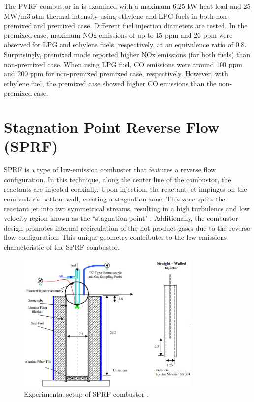 The PVRF combustor in \cite{AHMAD2023101200} is examined with a maximum 6.25 kW heat load and 25 MW/m3-atm thermal intensity using ethylene and LPG fuels in both non-premixed and premixed case. Different fuel injection diameters are tested. In the premixed case, maximum NOx emissions of up to 15 ppm and 26 ppm were observed for LPG and ethylene fuels, respectively, at an equivalence ratio of 0.8. Surprisingly, premixed mode reported higher NOx emissions (for both fuels) than non-premixed case. When using LPG fuel, CO emissions were around 100 ppm and 200 ppm for non-premixed premixed case, respectively. However, with ethylene fuel, the premixed case showed higher CO emissions than the non-premixed case.

\section{Stagnation Point Reverse Flow (SPRF)}

SPRF is a type of low-emission combustor that features a reverse flow configuration. In this technique, along the center line of the combustor, the reactants are injected coaxially. Upon injection, the reactant jet impinges on the combustor's bottom wall, creating a stagnation zone. This zone splits the reactant jet into two symmetrical streams, resulting in a high turbulence and low velocity region known as the ``stagnation point" \cite{bobba2008SPRF}. Additionally, the combustor design promotes internal recirculation of the hot product gases due to the reverse flow configuration. This unique geometry contributes to the low emissions characteristic of the SPRF combustor.

\begin{figure}[!ht]
    \centering
    \includegraphics[width=0.8\textwidth]{Chapter2/Images/SPRF_.jpeg}
    \caption[Experimental setup of SPRF combustor]{Experimental setup of SPRF combustor \cite{CJNYJS91338}.}
    \label{fig:Ch2SPRF}
\end{figure}

